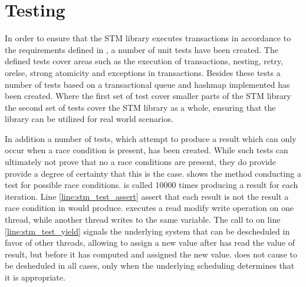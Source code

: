 \section{Testing}
In order to ensure that the \ac{STM} library executes transactions in accordance to the requirements defined in , a number of unit tests have been created. The defined tests cover areas such as the execution of transactions, nesting, retry, orelse, strong atomicity and exceptions in transactions. Besides these tests a number of tests based on a transactional queue and hashmap implemented has been created. Where the first set of test cover smaller parts of the \ac{STM} library the second set of tests cover the \ac{STM} library as a whole, ensuring that the library can be utilized for real world scenarios.

In addition a number of tests, which attempt to produce a result which can only occur when a race condition is present, has been created. While such tests can ultimately not prove that no a race conditions are present, they do provide provide a degree of certainty that this is the case.  shows the  method conducting a test for possible race conditions.  is called 10000 times producing a result for each iteration. Line \ref{line:stm_test_assert} assert that each result is not the result a race condition in  would produce.  executes a read modify write operation on one thread, while another thread writes to the same variable. The call to  on line \ref{line:stm_test_yield} signals the underlying system that  can be descheduled in favor of other threads, allowing  to assign  a new value after  has read the value of result, but before it has computed and assigned the new value.  does not cause  to be desheduled in all cases, only when the underlying scheduling determines that it is appropriate. 

